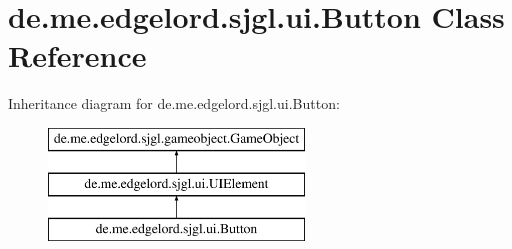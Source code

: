 \hypertarget{classde_1_1me_1_1edgelord_1_1sjgl_1_1ui_1_1_button}{}\section{de.\+me.\+edgelord.\+sjgl.\+ui.\+Button Class Reference}
\label{classde_1_1me_1_1edgelord_1_1sjgl_1_1ui_1_1_button}
Inheritance diagram for de.\+me.\+edgelord.\+sjgl.\+ui.\+Button\+:\begin{figure}[H]
\begin{center}
\leavevmode
\includegraphics[height=3.000000cm]{classde_1_1me_1_1edgelord_1_1sjgl_1_1ui_1_1_button}
\end{center}
\end{figure}
